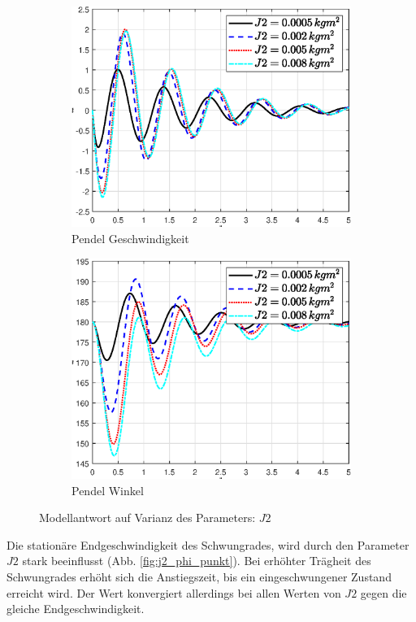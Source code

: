 \begin{figure}
    \begin{subfigure}[b]{0.49\linewidth}
        \includegraphics[width=\linewidth]{Bilder/5_sensi/fig/j2/theta_punkt.eps}
        \caption{Pendel Geschwindigkeit}
        \label{fig:j2_theta_punkt}      
    \end{subfigure}
    \begin{subfigure}[b]{0.49\linewidth}
        \includegraphics[width=\linewidth]{Bilder/5_sensi/fig/j2/theta.eps}
        \caption{Pendel Winkel}
        \label{fig:j2_theta}
    \end{subfigure}
        \caption{Modellantwort auf Varianz des Parameters: $J2$}
        \label{fig:j2}
\end{figure}
Die stationäre Endgeschwindigkeit des Schwungrades, wird durch den Parameter $J2$ stark beeinflusst (Abb. \ref{fig:j2_phi_punkt}). 
Bei erhöhter Trägheit des Schwungrades erhöht sich die Anstiegszeit, bis ein eingeschwungener Zustand erreicht wird.
Der Wert konvergiert allerdings bei allen Werten von $J2$ gegen die gleiche Endgeschwindigkeit.\\

